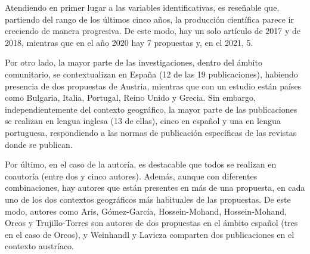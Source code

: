 \documentclass[spanish]{textolivre}
\begin{document}
\endgroup

Atendiendo en primer lugar a las variables identificativas, es reseñable que, partiendo del rango de los últimos cinco años, la producción científica parece ir creciendo de manera progresiva. De este modo, hay un solo artículo de 2017 y de 2018, mientras que en el año 2020 hay 7 propuestas y, en el 2021, 5.

Por otro lado, la mayor parte de las investigaciones, dentro del ámbito comunitario, se contextualizan en España (12 de las 19 publicaciones), habiendo presencia de dos propuestas de Austria, mientras que con un estudio están países como Bulgaria, Italia, Portugal, Reino Unido y Grecia. Sin embargo, independientemente del contexto geográfico, la mayor parte de las publicaciones se realizan en lengua inglesa (13 de ellas), cinco en español y una en lengua portuguesa, respondiendo a las normas de publicación específicas de las revistas donde se publican.

Por último, en el caso de la autoría, es destacable que todos se realizan en coautoría (entre dos y cinco autores). Además, aunque con diferentes combinaciones, hay autores que están presentes en más de una propuesta, en cada uno de los dos contextos geográficos más habituales de las propuestas. De este modo, autores como Aris, Gómez-García, Hossein-Mohand, Hossein-Mohand, Orcos y Trujillo-Torres son autores de dos propuestas en el ámbito español (tres en el caso de Orcos), y Weinhandl y Lavicza comparten dos publicaciones en el contexto austríaco.
\end{document}
